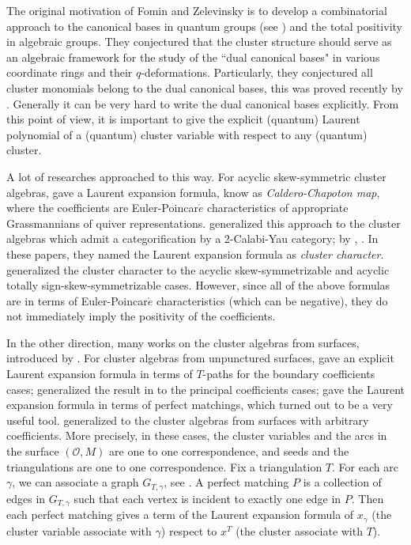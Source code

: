 \documentclass[10pt]{amsart}
\theoremstyle{theorems}
\begin{document}
\medskip

The original motivation of Fomin and Zelevinsky is to develop a combinatorial approach to the canonical bases in quantum groups (see \cite{L,K}) and the total positivity in algebraic groups. They conjectured that the cluster structure should serve as an algebraic framework for the study of the ``dual canonical bases" in various coordinate rings and their $q$-deformations. Particularly, they conjectured all cluster monomials belong to the dual canonical bases, this was proved recently by \cite{KKKO,Q}. Generally it can be very hard to write the dual canonical bases explicitly. From this point of view, it is important to give the explicit (quantum) Laurent polynomial of a (quantum) cluster variable with respect to any (quantum) cluster.

\medskip

 A lot of researches approached to this way. For acyclic skew-symmetric cluster algebras, \cite{CC,CK,CK1} gave a Laurent expansion formula, know as \emph{Caldero-Chapoton map}, where the coefficients are Euler-Poincar$\acute{e}$ characteristics of appropriate Grassmannians of quiver representations. \cite{FK,P,PP,PP1} generalized this approach to the cluster algebras which admit a categorification by a 2-Calabi-Yau category; by \cite{A}, \cite{L-F}. In these papers, they named the Laurent expansion formula as \emph{cluster character}. \cite{DE,HL,CHL} generalized the cluster character to the acyclic skew-symmetrizable and acyclic totally sign-skew-symmetrizable cases. However, since all of the above formulas are in terms of Euler-Poincar$\acute{e}$ characteristics (which can be negative), they do not immediately imply the positivity of the coefficients.

\medskip

In the other direction, many works on the cluster algebras from surfaces, introduced by \cite{FST}. For cluster algebras from unpunctured surfaces, \cite{ST} gave an explicit Laurent expansion formula in terms of $T$-paths for the boundary coefficients cases; \cite{S} generalized the result in \cite{ST} to the principal coefficients cases; \cite{MS} gave the Laurent expansion formula in terms of perfect matchings, which turned out to be a very useful tool. \cite{MSW} generalized \cite{MS} to the cluster algebras from surfaces with arbitrary coefficients. More precisely, in these cases, the cluster variables and the arcs in the surface $(\mathcal O,M)$ are one to one correspondence, and seeds and the triangulations are one to one correspondence. Fix a triangulation $T$. For each arc $\gamma$, we can associate a graph $G_{T,\gamma}$, see \cite{MS,CS}. A perfect matching $P$ is a collection of edges in $G_{T,\gamma}$ such that each vertex is incident to exactly one edge in $P$. Then each perfect matching gives a term of the Laurent expansion formula of $x_{\gamma}$ (the cluster variable associate with $\gamma$) respect to $x^{T}$ (the cluster associate with $T$).
\end{document}
